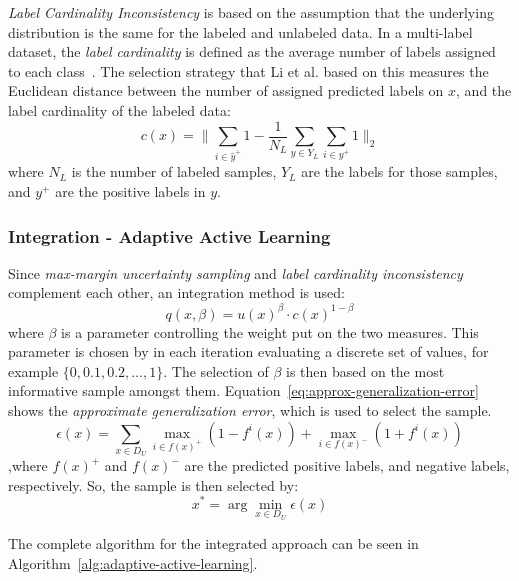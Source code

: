 \textit{Label Cardinality Inconsistency} is based on the assumption that the underlying distribution is the same for the labeled and unlabeled data.
In a multi-label dataset, the \textit{label cardinality} is defined as the average number of labels assigned to each class~\cite{tsoumakas2006multi}.
The selection strategy that Li et al\@. based on this measures the Euclidean distance between the number of assigned predicted labels on $x$, and the label cardinality of the labeled data:
\begin{equation}
    c(x) = \bigg \lVert \sum_{i \in \hat{y}^+} 1 - \frac{1}{N_L} \sum_{y \in Y_L} \sum_{i \in y^+} 1 \bigg \rVert_2
\end{equation}
where $N_L$ is the number of labeled samples, $Y_L$ are the labels for those samples, and $y^+$ are the positive labels in $y$.

\subsubsection{Integration - Adaptive Active Learning}

Since \textit{max-margin uncertainty sampling} and \textit{label cardinality inconsistency} complement each other, an integration method is used:
\begin{equation}\label{eq:approx-generalization-error}
    q(x, \beta) = u(x)^\beta \cdot c(x)^{1-\beta}
\end{equation}
where $\beta$ is a parameter controlling the weight put on the two measures.
This parameter is chosen by in each iteration evaluating a discrete set of values, for example $\{0, 0.1, 0.2, \dots, 1\}$.
The selection of $\beta$ is then based on the most informative sample amongst them.
Equation~\ref{eq:approx-generalization-error} shows the \textit{approximate generalization error}, which is used to select the sample.
\begin{equation}\label{eq:calc-epsilon}
    \epsilon(x) = \sum_{x \in D_U} \max_{i \in f(x)^+}(1-f^i(x)) + \max_{i \in f(x)^-}(1+f^i(x))
\end{equation}
,where $f(x)^+$ and $f(x)^-$ are the predicted positive labels, and negative labels, respectively.
So, the sample is then selected by:
\begin{equation}\label{eq:x-star}
    x^* = \arg \min_{x \in D_U} \epsilon(x)
\end{equation}

The complete algorithm for the integrated approach can be seen in Algorithm~\ref{alg:adaptive-active-learning}.

